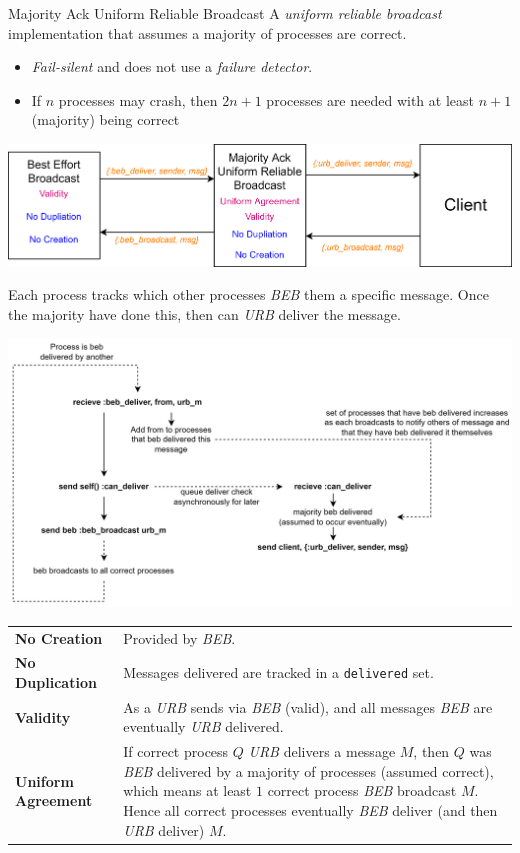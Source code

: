 \begin{definitionbox}{Majority Ack Uniform Reliable Broadcast}
    A \textit{uniform reliable broadcast} implementation that assumes a majority of processes are correct.
    \begin{itemize}
        \item \textit{Fail-silent} and does not use a \textit{failure detector}.
        \item If $n$ processes may crash, then $2n+1$ processes are needed with at least $n+1$ (majority) being correct
    \end{itemize}
\end{definitionbox}
\begin{center}
    \includegraphics[width=.8\textwidth]{broadcast/images/majority_ack_uniform_reliable_broadcast.drawio.png}
\end{center}
Each process tracks which other processes \textit{BEB} them a specific message. Once the majority have done this, then can \textit{URB} deliver the message.
\begin{center}
    \includegraphics[width=.8\textwidth]{broadcast/images/majority_ack_urb_correctness.drawio.png}
\end{center}
\begin{center}
    \begin{tabular}{l p{}}
        \textbf{No Creation} & Provided by \textit{BEB}. \\
        \textbf{No Duplication} & Messages delivered are tracked in a \texttt{delivered} set. \\
        \textbf{Validity} & As a \textit{URB} sends via \textit{BEB} (valid), and all messages \textit{BEB} are eventually \textit{URB} delivered. \\
        \textbf{Uniform Agreement} & If correct process $Q$ \textit{URB} delivers a message $M$, then $Q$ was \textit{BEB} delivered by a majority of 
        processes (assumed correct), which means at least $1$ correct process \textit{BEB} broadcast $M$. Hence all correct processes eventually \textit{BEB} deliver (and then \textit{URB} deliver) $M$. \\
    \end{tabular}
\end{center}
\inputminted{elixir}{broadcast/code/majority_ack_uniform_reliable_broadcast.ex}

